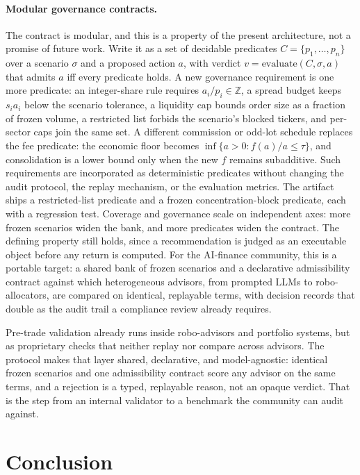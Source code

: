 \documentclass[sigconf,review,anonymous]{acmart}
\begin{document}
\paragraph{Modular governance contracts.} The contract is modular, and this is a property of the present architecture, not a promise of future work. Write it as a set of decidable predicates $C=\{p_1,\dots,p_n\}$ over a scenario $\sigma$ and a proposed action $a$, with verdict $v=\mathrm{evaluate}(C,\sigma,a)$ that admits $a$ iff every predicate holds. A new governance requirement is one more predicate: an integer-share rule requires $a_i/p_i\in\mathbb{Z}$, a spread budget keeps $s_i a_i$ below the scenario tolerance, a liquidity cap bounds order size as a fraction of frozen volume, a restricted list forbids the scenario's blocked tickers, and per-sector caps join the same set. A different commission or odd-lot schedule replaces the fee predicate: the economic floor becomes $\inf\{a>0:f(a)/a\leq\tau\}$, and consolidation is a lower bound only when the new $f$ remains subadditive. Such requirements are incorporated as deterministic predicates without changing the audit protocol, the replay mechanism, or the evaluation metrics. The artifact ships a restricted-list predicate and a frozen concentration-block predicate, each with a regression test. Coverage and governance scale on independent axes: more frozen scenarios widen the bank, and more predicates widen the contract. The defining property still holds, since a recommendation is judged as an executable object before any return is computed. For the AI-finance community, this is a portable target: a shared bank of frozen scenarios and a declarative admissibility contract against which heterogeneous advisors, from prompted LLMs to robo-allocators, are compared on identical, replayable terms, with decision records that double as the audit trail a compliance review already requires.

Pre-trade validation already runs inside robo-advisors and portfolio systems, but as proprietary checks that neither replay nor compare across advisors. The protocol makes that layer shared, declarative, and model-agnostic: identical frozen scenarios and one admissibility contract score any advisor on the same terms, and a rejection is a typed, replayable reason, not an opaque verdict. That is the step from an internal validator to a benchmark the community can audit against.

\section{Conclusion}
\end{document}
